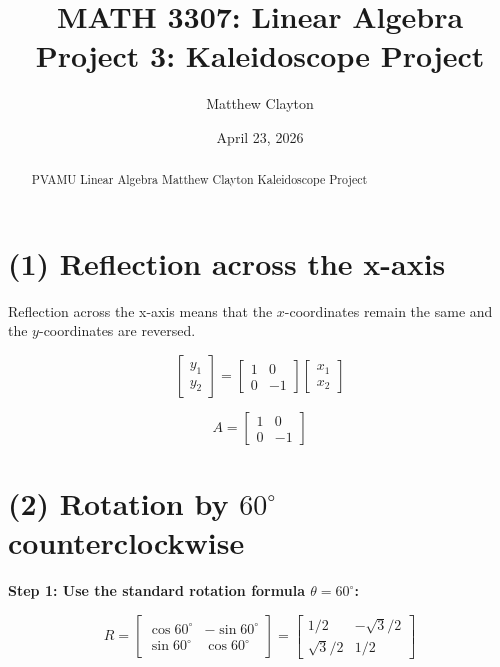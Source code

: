 \title{MATH 3307: Linear Algebra \\ Project 3: Kaleidoscope Project}
\author{Matthew Clayton}
\date{April 23, 2026}



\begin{abstract}
        PVAMU Linear Algebra Matthew Clayton Kaleidoscope Project
\end{abstract}
\maketitle

\section*{(1) Reflection across the x-axis}

Reflection across the x-axis means that the $x$-coordinates remain the same and the $y$-coordinates are reversed.

\[
\begin{bmatrix}
y_1 \\
y_2
\end{bmatrix}
=
\begin{bmatrix}
1 & 0 \\
0 & -1
\end{bmatrix}
\begin{bmatrix}
x_1 \\
x_2
\end{bmatrix}
\]


\[
A =
\begin{bmatrix}
1 & 0 \\
0 & -1
\end{bmatrix}
\]

\section*{(2) Rotation by $60^\circ$ counterclockwise}

\textbf{Step 1: Use the standard rotation formula $\theta = 60^\circ$:}


\[
R =
\begin{bmatrix}
\cos 60^\circ & -\sin 60^\circ \\ \sin 60^\circ & \cos 60^\circ
\end{bmatrix} = \begin{bmatrix}
    1/2 & -\sqrt{3}/2 \\ \sqrt{3}/2 & 1/2
\end{bmatrix} 
\]


